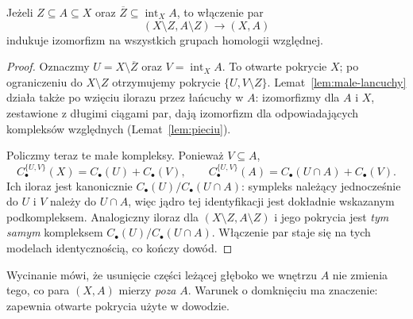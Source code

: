\begin{twierdzenie}[Wycinanie]
\label{thm:wycinanie}
Jeżeli $Z\subseteq A\subseteq X$ oraz
$\overline Z\subseteq\operatorname{int}_X A$,
to włączenie par
\[
 (X\setminus Z,A\setminus Z)\longrightarrow(X,A)
\]
indukuje izomorfizm na wszystkich
grupach homologii względnej.
\end{twierdzenie}
\begin{proof}
Oznaczmy $U=X\setminus\overline Z$
oraz $V=\operatorname{int}_X A$.
To otwarte pokrycie $X$;
po ograniczeniu do $X\setminus Z$
otrzymujemy pokrycie
$\{U,V\setminus Z\}$.
Lemat~\ref{lem:male-lancuchy} działa
także po wzięciu ilorazu przez
łańcuchy w $A$: izomorfizmy
dla $A$ i $X$, zestawione
z długimi ciągami par, dają
izomorfizm dla odpowiadających
kompleksów względnych
(Lemat~\ref{lem:pieciu}).

Policzmy teraz te małe kompleksy.
Ponieważ $V\subseteq A$,
\[
 C_\bullet^{\{U,V\}}(X)
   =C_\bullet(U)+C_\bullet(V),\qquad
 C_\bullet^{\{U,V\}}(A)
   =C_\bullet(U\cap A)+C_\bullet(V).
\]
Ich iloraz jest kanonicznie
$C_\bullet(U)/C_\bullet(U\cap A)$:
sympleks należący jednocześnie do
$U$ i $V$ należy do $U\cap A$,
więc jądro tej identyfikacji jest
dokładnie wskazanym podkompleksem.
Analogiczny iloraz dla
$(X\setminus Z,A\setminus Z)$
i jego pokrycia jest \emph{tym samym}
kompleksem
$C_\bullet(U)/C_\bullet(U\cap A)$.
Włączenie par staje się na tych
modelach identycznością, co
kończy dowód.
\end{proof}

Wycinanie mówi, że usunięcie części
leżącej głęboko we wnętrzu $A$
nie zmienia tego, co para $(X,A)$
mierzy \emph{poza} $A$. Warunek
o domknięciu ma znaczenie:
zapewnia otwarte pokrycia użyte
w dowodzie.

